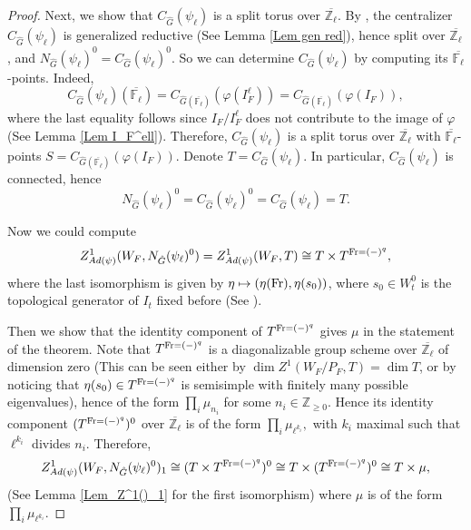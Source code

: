 \begin{theorem}
\begin{proof}
    	Next, we show that $C_{\hat{G}}(\psi_{\ell})$ is a split torus over $\overline{\mathbb{Z}_{\ell}}$. By \cite[Subsection 3.1]{dat2022ihes}, the centralizer $C_{\hat{G}}(\psi_{\ell})$ is generalized reductive (See Lemma \ref{Lem gen red}), hence split over $\overline{\mathbb{Z}_{\ell}}$, and $N_{\hat{G}}(\psi_{\ell})^0=C_{\hat{G}}(\psi_{\ell})^0$. So we can determine $C_{\hat{G}}(\psi_{\ell})$ by computing its $\overline{\mathbb{F}_{\ell}}$-points. Indeed,
    	$$C_{\hat{G}}(\psi_{\ell})(\overline{\mathbb{F}_{\ell}})=C_{\hat{G}(\overline{\mathbb{F}_{\ell}})}(\varphi(I_F^\ell))=C_{\hat{G}(\overline{\mathbb{F}_{\ell}})}(\varphi(I_F)),$$
    	where the last equality follows since $I_F/I_F^{\ell}$ does not contribute to the image of $\varphi$ (See Lemma \ref{Lem I_F^ell}). Therefore, $C_{\hat{G}}(\psi_{\ell})$ is a split torus over $\overline{\mathbb{Z}_{\ell}}$ with $\overline{\mathbb{F}_{\ell}}$-points $S=C_{\hat{G}(\overline{\mathbb{F}_{\ell}})}(\varphi(I_F))$. Denote $T=C_{\hat{G}}(\psi_{\ell})$. In particular, $C_{\hat{G}}(\psi_{\ell})$  is connected, hence 
    	\begin{equation}\label{Equation: T}
    	N_{\hat{G}}(\psi_{\ell})^0=C_{\hat{G}}(\psi_{\ell})^0=C_{\hat{G}}(\psi_{\ell})=T.
    	\end{equation}
    	
    	
    	Now we could compute
    	$$Z^1_{Ad(\psi)}(W_F, N_{\hat{G}}(\psi_{\ell})^0)=Z^1_{Ad(\psi)}(W_F, T) \cong T \times T^{\operatorname{Fr}=(-)^q},$$
    	where the last isomorphism is given by $\eta \mapsto (\eta(\operatorname{Fr}), \eta(s_0))$, where $s_0 \in W_t^0$ is the topological generator of $I_t$ fixed before (See \cite[Example 3.14]{dat2022ihes}).
    	
    	Then we show that the identity component of $T^{\operatorname{Fr}=(-)^q}$ gives $\mu$ in the statement of the theorem. Note that $T^{\operatorname{Fr}=(-)^q}$ is a diagonalizable group scheme over $\overline{\mathbb{Z}_{\ell}}$ of dimension zero (This can be seen either by $\dim Z^1(W_F/P_F, T)=\dim T$, or by noticing that $\eta(s_0) \in T^{\operatorname{Fr}=(-)^q}$ is semisimple with finitely many possible eigenvalues), hence of the form $\prod_i\mu_{n_i}$ for some $n_i \in \mathbb{Z}_{\geq 0}$. Hence its identity component $(T^{\operatorname{Fr}=(-)^q})^0$ over $\overline{\mathbb{Z}_{\ell}}$ is of the form $\prod_i\mu_{\ell^{k_i}},$ with $k_i$ maximal such that $\ell^{k_i}$ divides $n_i$. Therefore, 
    	$$Z^1_{Ad(\psi)}(W_F, N_{\hat{G}}(\psi_{\ell})^0)_1 \cong (T \times T^{\operatorname{Fr}=(-)^q})^0 \cong T \times (T^{\operatorname{Fr}=(-)^q})^0 \cong T \times \mu,$$
    	(See Lemma \ref{Lem_Z^1()_1} for the first isomorphism) where $\mu$ is of the form $\prod_i\mu_{\ell^{k_i}}$.
    	

\end{proof}
\end{theorem}
